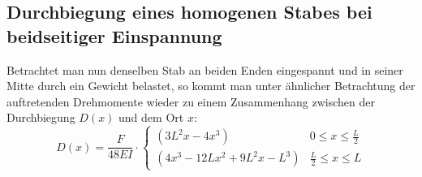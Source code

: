 \subsection{Durchbiegung eines homogenen Stabes bei beidseitiger
  Einspannung}

Betrachtet man nun denselben Stab an beiden Enden eingespannt und in
seiner Mitte durch ein Gewicht belastet, so kommt man unter ähnlicher
Betrachtung der auftretenden Drehmomente wieder zu einem Zusammenhang
zwischen der Durchbiegung $D(x)$ und dem Ort $x$:
%
\begin{equation}
  \label{eq:durchbiegung-beidseitig}
  D(x) = \frac{F}{48 E I} \cdot 
  \begin{cases}
    (3 L^2 x - 4 x^3) & 0\le x\le \frac{L}{2}\\
    (4 x^3 - 12 L x^2 + 9 L^2 x - L^3) & \frac{L}{2}\le x\le L
  \end{cases}
\end{equation}

